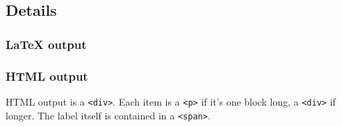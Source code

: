 \hypertarget{details}{%
\subsection{Details}\label{details}}

\hypertarget{latex-output}{%
\subsubsection{LaTeX output}\label{latex-output}}

\begin{Shaded}
\begin{Highlighting}[]
\NormalTok{\{}\NormalTok{\}}




\NormalTok{\{}\NormalTok{\}}
\end{Highlighting}
\end{Shaded}

\hypertarget{html-output}{%
\subsubsection{HTML output}\label{html-output}}

HTML output is a \texttt{\textless{}div\textgreater{}}. Each item is a
\texttt{\textless{}p\textgreater{}} if it's one block long, a
\texttt{\textless{}div\textgreater{}} if longer. The label itself is
contained in a \texttt{\textless{}span\textgreater{}}.

